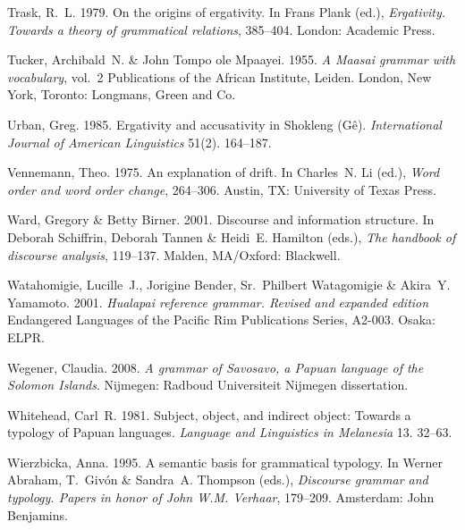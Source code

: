 \documentclass[ number=1
			   ,series=sidl
				,url=http://langsci-press.org/catalog/book/18 
			   ,isbn=978-3-944675-19-0
			   ,output=long   %
			  ]{LSP/langsci}
\begin{document}
\begin{thebibliography}{190}
Trask, R.~L. 1979.
\newblock On the origins of ergativity.
\newblock In Frans Plank (ed.), \emph{Ergativity. {T}owards a theory of
  grammatical relations}, 385--404. London: Academic Press.

Tucker, Archibald~N. \& John {Tompo ole Mpaayei}. 1955.
\newblock \emph{A {M}aasai grammar with vocabulary}, vol.~2 Publications of the
  {A}frican {I}nstitute, Leiden.
\newblock London, New York, Toronto: Longmans, Green and Co.

Urban, Greg. 1985.
\newblock Ergativity and accusativity in {S}hokleng ({G}{\^e}).
\newblock \emph{International Journal of American Linguistics} 51(2). 164--187.

Vennemann, Theo. 1975.
\newblock An explanation of drift.
\newblock In {\relax Ch}arles~N. Li (ed.), \emph{Word order and word order
  change}, 264--306. Austin, TX: University of Texas Press.
\enlargethispage{\baselineskip}

Ward, Gregory \& Betty Birner. 2001.
\newblock Discourse and information structure.
\newblock In Deborah Schiffrin, Deborah Tannen \& Heidi~E. Hamilton (eds.),
  \emph{The handbook of discourse analysis}, 119--137. Malden, MA/Oxford:
  Blackwell.

Watahomigie, Lucille~J., Jorigine Bender, Sr.~Philbert Watagomigie \& Akira~Y.
  Yamamoto. 2001.
\newblock \emph{{H}ualapai reference grammar. {R}evised and expanded edition}
  Endangered Languages of the Pacific Rim Publications Series, A2-003.
\newblock Osaka: ELPR.

Wegener, Claudia. 2008.
\newblock \emph{A grammar of {S}avosavo, a {P}apuan language of the {S}olomon
  {I}slands}.
\newblock Nijmegen: Radboud Universiteit Nijmegen dissertation.

Whitehead, Carl~R. 1981.
\newblock Subject, object, and indirect object: {T}owards a typology of
  {P}apuan languages.
\newblock \emph{Language and Linguistics in Melanesia} 13. 32--63.

Wierzbicka, Anna. 1995.
\newblock A semantic basis for grammatical typology.
\newblock In Werner Abraham, T.~Giv\'on \& Sandra~A. Thompson (eds.),
  \emph{Discourse grammar and typology. {P}apers in honor of {J}ohn {W.M.}
  {V}erhaar}, 179--209. Amsterdam: John Benjamins.


\end{thebibliography}
\end{document}
